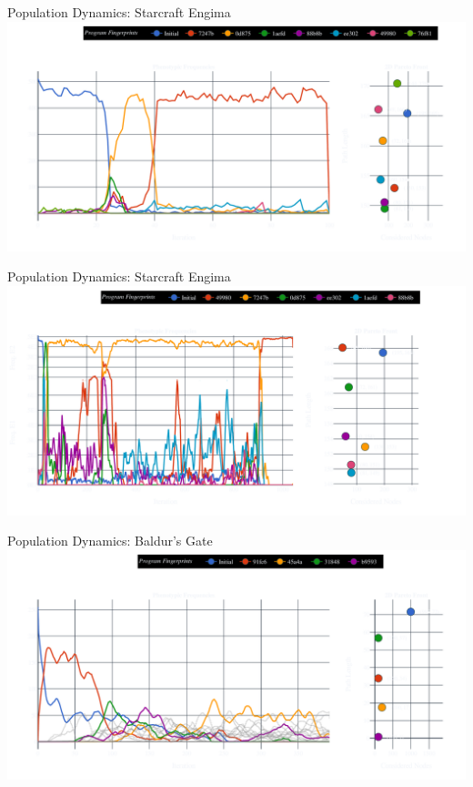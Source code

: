 \documentclass[aspectratio=169]{beamer}
\begin{document}
\begin{frame}{Population Dynamics: Starcraft Engima}
    \includegraphics[width=1.0\linewidth, keepaspectratio]{figures/early_pheno.pdf}
\end{frame}

\begin{frame}{Population Dynamics: Starcraft Engima}
    \includegraphics[width=1.0\linewidth, keepaspectratio]{figures/pheno.pdf}
\end{frame}

\begin{frame}{Population Dynamics: Baldur's Gate}
    \includegraphics[width=1.0\linewidth, keepaspectratio]{figures/baldurs_pheno_60.pdf}
\end{frame}
\end{document}
